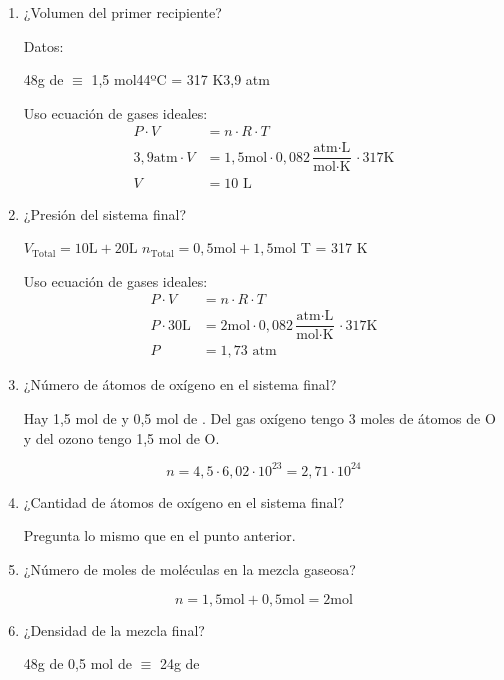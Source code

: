 \begin{enumerate}[left=0cm]
\setlength\itemsep{2\baselineskip}

\item ¿Volumen del primer recipiente?

Datos:

\hfil48g de  $\equiv$ 1,5 mol\hfil 44ºC = 317 K\hfil 3,9 atm\hfil

Uso ecuación de gases ideales:
\begin{align*}
    P\cdot V &= n \cdot R \cdot T\\
    3,9 \text{atm}\cdot V &= 1,5\text{mol} \cdot 0,082\dfrac{\text{atm}\cdot \text{L}}{\text{mol}\cdot\text{K}}  \cdot 317 \text{K}\\
    V &= 10 \text{ L}
\end{align*}


\item ¿Presión del sistema final?

\hfil
$V_{\text{Total}} = 10 \text{L} + 20 \text{L}$
\hfil
$n_{\text{Total}} = 0,5 \text{mol} + 1,5 \text{mol}$
\hfil
T = 317 K
\hfil

Uso ecuación de gases ideales:
\begin{align*}
    P\cdot V &= n \cdot R \cdot T\\
    P\cdot 30 \text{L} &= 2\text{mol} \cdot 0,082\dfrac{\text{atm}\cdot \text{L}}{\text{mol}\cdot\text{K}}  \cdot 317 \text{K}\\
    P &= 1,73 \text{ atm}
\end{align*}


\item ¿Número de átomos de oxígeno en el sistema final?

Hay 1,5 mol de  y 0,5 mol de . Del gas oxígeno tengo 3 moles de átomos de O y del ozono tengo 1,5 mol de O.

$$n = 4,5 \cdot 6,02 \cdot 10^{23} = 2,71 \cdot 10^{24}$$


\item ¿Cantidad de átomos de oxígeno en el sistema final?

Pregunta lo mismo que en el punto anterior.


\item ¿Número de moles de moléculas en la mezcla gaseosa?

$$n = 1,5 \text{mol} + 0,5 \text{mol} = 2 \text{mol}$$


\item ¿Densidad de la mezcla final?

\hfil
48g de 
\hfil
0,5 mol de  $\equiv$ 24g de 
\hfil


\end{enumerate}
